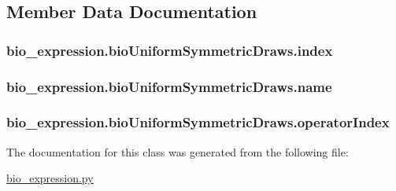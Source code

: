 \subsection{Member Data Documentation}
\hypertarget{classbio__expression_1_1bio_uniform_symmetric_draws_a07f762feb8b8f5ef9a6a98bc52adfa87}{
\subsubsection[{index}]{\setlength{\rightskip}{0pt plus 5cm}bio\+\_\+expression.\+bio\+Uniform\+Symmetric\+Draws.\+index}}\label{classbio__expression_1_1bio_uniform_symmetric_draws_a07f762feb8b8f5ef9a6a98bc52adfa87}
\hypertarget{classbio__expression_1_1bio_uniform_symmetric_draws_aab7be549ea560902d59e88bdb4cbb255}{
\subsubsection[{name}]{\setlength{\rightskip}{0pt plus 5cm}bio\+\_\+expression.\+bio\+Uniform\+Symmetric\+Draws.\+name}}\label{classbio__expression_1_1bio_uniform_symmetric_draws_aab7be549ea560902d59e88bdb4cbb255}
\hypertarget{classbio__expression_1_1bio_uniform_symmetric_draws_aeef138ac83667f40e020df25eed624a1}{
\subsubsection[{operator\+Index}]{\setlength{\rightskip}{0pt plus 5cm}bio\+\_\+expression.\+bio\+Uniform\+Symmetric\+Draws.\+operator\+Index}}\label{classbio__expression_1_1bio_uniform_symmetric_draws_aeef138ac83667f40e020df25eed624a1}


The documentation for this class was generated from the following file\+:\begin{DoxyCompactItemize}
\item 
\hyperlink{bio__expression_8py}{bio\+\_\+expression.\+py}\end{DoxyCompactItemize}
